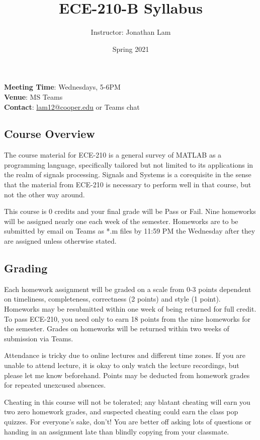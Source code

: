\documentclass{article}
\title{ECE-210-B Syllabus}
\author{Instructor: Jonathan Lam}
\date{Spring 2021}
\begin{document}
	\maketitle
	\noindent\textbf{Meeting Time}: Wednesdays, 5-6PM \\
	\textbf{Venue}: MS Teams \\
	\textbf{Contact}: \href{mailto:lam12@cooper.edu}{lam12@cooper.edu} or Teams chat
	
	\subsection*{Course Overview}
	The course material for ECE-210 is a general survey of MATLAB as a programming language, specifically tailored but not limited to its applications in the realm of signals processing. Signals and Systems is a corequisite in the sense that the material from ECE-210 is necessary to perform well in that course, but not the other way around.
	
	This course is 0 credits and your final grade will be Pass or Fail. Nine homeworks will be assigned nearly one each week of the semester. Homeworks are to be submitted by email on Teams as *.m files by 11:59 PM the Wednesday after they are assigned unless otherwise stated.
	
	\subsection*{Grading}
	Each homework assignment will be graded on a scale from 0-3 points dependent on timeliness, completeness, correctness (2 points) and style (1 point). Homeworks may be resubmitted within one week of being returned for full credit. To pass ECE-210, you need only to earn 18 points from the nine homeworks for the semester. Grades on homeworks will be returned within two weeks of submission via Teams.
	
	Attendance is tricky due to online lectures and different time zones. If you are unable to attend lecture, it is okay to only watch the lecture recordings, but please let me know beforehand. Points may be deducted from homework grades for repeated unexcused absences.
	
	Cheating in this course will not be tolerated; any blatant cheating will earn you two zero homework grades, and suspected cheating could earn the class pop quizzes. For everyone's sake, don't! You are better off asking lots of questions or handing in an assignment late than blindly copying from your classmate.
	
\end{document}
